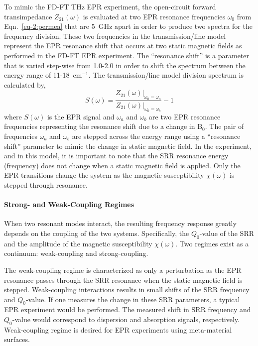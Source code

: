 To mimic the FD-FT THz EPR experiment, the open-circuit forward transimpedance $Z_{21}(\omega)$ is evaluated at two EPR resonance frequencies $\omega_0$ from Eqn.~\ref{eq-2:permea} that are 5~GHz apart in order to produce two spectra for the frequency division. These two frequencies in the transmission\-/line model represent the EPR resonance shift that occurs at two static magnetic fields as performed in the FD-FT EPR experiment. The ``resonance shift'' is a parameter that is varied step-wise from 1.0-2.0 in order to shift the spectrum between the energy range of 11-18~cm$^{-1}$. The transmission\-/line model division spectrum is calculated by, 
\begin{equation}
    S(\omega) = \frac{Z_{21}(\omega)\Bigr\rvert_{\omega_0 = \omega_a}}{Z_{21}(\omega)\Bigr\rvert_{\omega_0 = \omega_b}} - 1
\end{equation}
where $S(\omega)$ is the EPR signal and $\omega_a$ and $\omega_b$ are two EPR resonance frequencies representing the resonance shift due to a change in B$_0$. The pair of frequencies $\omega_a$ and $\omega_b$ are stepped across the energy range using a ``resonance shift'' parameter to mimic the change in static magnetic field. In the experiment, and in this model, it is important to note that the SRR resonance energy (frequency) does not change when a static magnetic field is applied. Only the EPR transitions change the system as the magnetic susceptibility $\chi(\omega)$ is stepped through resonance.

\noindent \paragraph*{Strong- and Weak-Coupling Regimes}
When two resonant modes interact, the resulting frequency response greatly depends on the coupling of the two systems. Specifically, the $Q_0$-value of the SRR and the amplitude of the magnetic susceptibility $\chi(\omega)$. Two regimes exist as a continuum: weak-coupling and strong-coupling. 

The weak-coupling regime is characterized as only a perturbation as the EPR resonance passes through the SRR resonance when the static magnetic field is stepped. Weak-coupling interactions results in small shifts of the SRR frequency and $Q_0$-value. If one measures the change in these SRR parameters, a typical EPR experiment would be performed. The measured shift in SRR frequency and $Q_0$-value would correspond to dispersion and absorption signals, respectively. \cite{abragam1961, poole} Weak-coupling regime is desired for EPR experiments using meta-material surfaces.

